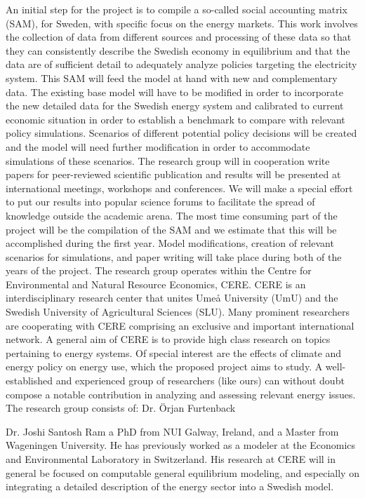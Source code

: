 \documentclass[10pt,a4paper]{article}
\begin{document}
An initial step for the project is to compile a so-called social accounting matrix (SAM), for Sweden, with specific focus on the energy markets. This work involves the collection of data from different sources and processing of these data so that they can consistently describe the Swedish economy in equilibrium and that the data are of sufficient detail to adequately analyze policies targeting the electricity system. This SAM will feed the model at hand with new and complementary data.
The existing base model will have to be modified in order to incorporate the new detailed data for the Swedish energy system and calibrated to current economic situation in order to establish a benchmark to compare with relevant policy simulations. Scenarios of different potential policy decisions will be created and the model will need further modification in order to accommodate simulations of these scenarios.
The research group will in cooperation write papers for peer-reviewed scientific publication and results will be presented at international meetings, workshops and conferences. We will make a special effort to put our results into popular science forums to facilitate the spread of knowledge outside the academic arena.
The most time consuming part of the project will be the compilation of the SAM and we estimate that this will be accomplished during the first year. Model modifications, creation of relevant scenarios for simulations, and paper writing will take place during both of the years of the project.
The research group operates within the Centre for Environmental and Natural Resource Economics, CERE. CERE is an interdisciplinary research center that unites Umeå University (UmU) and the Swedish University of Agricultural Sciences (SLU). Many prominent researchers are cooperating with CERE comprising an exclusive and important international network. A general aim of CERE is to provide high class research on topics pertaining to energy systems. Of special interest are the effects of climate and energy policy on energy use, which the proposed project aims to study. A well-established and experienced group of researchers (like ours) can without doubt compose a notable contribution in analyzing and assessing relevant energy issues.
The research group consists of:
Dr. Örjan Furtenback

Dr. Joshi Santosh Ram a PhD from NUI Galway, Ireland, and a Master from Wageningen University. He has previously worked as a modeler at the Economics and Environmental Laboratory in Switzerland. His research at CERE will in general be focused on computable general equilibrium modeling, and especially on integrating a detailed description of the energy sector into a Swedish model.
\end{document}
